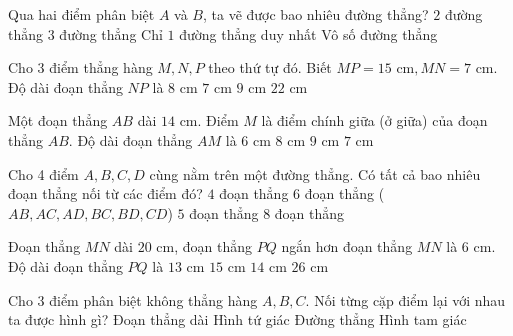 \begin{ex} %
Qua hai điểm phân biệt $A$ và $B$, ta vẽ được bao nhiêu đường thẳng?
\choice
{$2$ đường thẳng}
{$3$ đường thẳng}
{\True Chỉ $1$ đường thẳng duy nhất}
{Vô số đường thẳng}
\end{ex}

\begin{ex} %
Cho 3 điểm thẳng hàng $M, N, P$ theo thứ tự đó. Biết $MP = 15\text{ cm}, MN = 7\text{ cm}$. Độ dài đoạn thẳng $NP$ là
\choice
{\True $8\text{ cm}$}
{$7\text{ cm}$}
{$9\text{ cm}$}
{$22\text{ cm}$}
\end{ex}

\begin{ex} %
Một đoạn thẳng $AB$ dài $14\text{ cm}$. Điểm $M$ là điểm chính giữa (ở giữa) của đoạn thẳng $AB$. Độ dài đoạn thẳng $AM$ là
\choice
{$6\text{ cm}$}
{$8\text{ cm}$}
{$9\text{ cm}$}
{\True $7\text{ cm}$}
\end{ex}

\begin{ex} %
Cho 4 điểm $A, B, C, D$ cùng nằm trên một đường thẳng. Có tất cả bao nhiêu đoạn thẳng nối từ các điểm đó?
\choice
{$4$ đoạn thẳng}
{\True $6$ đoạn thẳng ($AB, AC, AD, BC, BD, CD$)}
{$5$ đoạn thẳng}
{$8$ đoạn thẳng}
\end{ex}

\begin{ex} %
Đoạn thẳng $MN$ dài $20\text{ cm}$, đoạn thẳng $PQ$ ngắn hơn đoạn thẳng $MN$ là $6\text{ cm}$. Độ dài đoạn thẳng $PQ$ là
\choice
{$13\text{ cm}$}
{$15\text{ cm}$}
{\True $14\text{ cm}$}
{$26\text{ cm}$}
\end{ex}

\begin{ex} %
Cho 3 điểm phân biệt không thẳng hàng $A, B, C$. Nối từng cặp điểm lại với nhau ta được hình gì?
\choice
{Đoạn thẳng dài}
{Hình tứ giác}
{Đường thẳng}
{\True Hình tam giác}
\end{ex}

